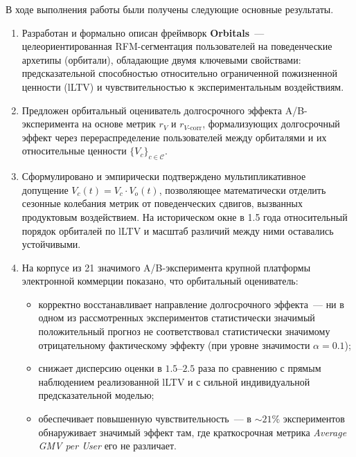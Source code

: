
В ходе выполнения работы были получены следующие основные результаты.

\begin{enumerate}
    \item Разработан и формально описан фреймворк \textbf{Orbitals}~---
          целеориентированная RFM-сегментация пользователей на
          поведенческие архетипы (орбитали), обладающие двумя
          ключевыми свойствами: предсказательной способностью
          относительно ограниченной пожизненной ценности (lLTV) и
          чувствительностью к экспериментальным воздействиям.

    \item Предложен орбитальный оцениватель долгосрочного эффекта
          A/B-эксперимента на основе метрик $r_V$ и
          $r_{V\text{-corr}}$, формализующих долгосрочный эффект через
          перераспределение пользователей между орбиталями и их
          относительные ценности $\{V_c\}_{c \in \mathcal{C}}$.

    \item Сформулировано и эмпирически подтверждено мультипликативное
          допущение $V_c(t) = V_c \cdot V_o(t)$, позволяющее
          математически отделить сезонные колебания метрик от
          поведенческих сдвигов, вызванных продуктовым воздействием.
          На историческом окне в 1.5 года относительный порядок
          орбиталей по lLTV и масштаб различий между ними оставались
          устойчивыми.

    \item На корпусе из 21 значимого A/B-эксперимента крупной платформы
          электронной коммерции показано, что орбитальный оцениватель:
          \begin{itemize}
              \item корректно восстанавливает направление
                    долгосрочного эффекта~--- ни в одном из
                    рассмотренных экспериментов статистически значимый
                    положительный прогноз не соответствовал
                    статистически значимому отрицательному фактическому
                    эффекту (при уровне значимости $\alpha = 0.1$);
              \item снижает дисперсию оценки в $1.5$--$2.5$ раза по
                    сравнению с прямым наблюдением реализованной lLTV
                    и с сильной индивидуальной предсказательной моделью;
              \item обеспечивает повышенную чувствительность~--- в
                    ${\sim}21\%$ экспериментов обнаруживает значимый
                    эффект там, где краткосрочная метрика
                    \textit{Average GMV per User} его не различает.
          \end{itemize}


\end{enumerate}
